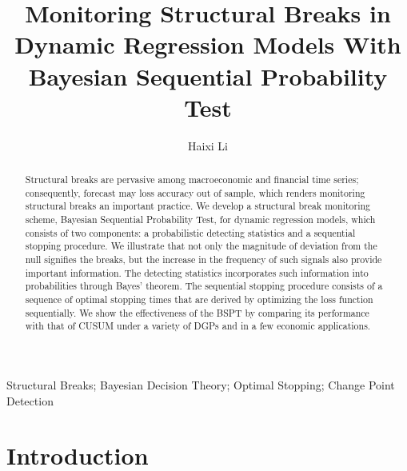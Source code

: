 \documentclass[preprint,authoryear,12pt,english]{elsarticle}
\theoremstyle{plain}
\begin{document}
\begin{frontmatter}
    \title{Monitoring Structural Breaks in Dynamic Regression Models With Bayesian Sequential Probability Test}

    \author{Haixi Li}



    \address[a]{Freddie Mac, 1551 Park Run Dr., McLean, VA, 22102, USA; Tel: (571)7812981; Email: haixi\_li@freddiemac.com}


    \begin{abstract}
        Structural breaks are pervasive among macroeconomic and financial time series; consequently, forecast may loss accuracy out of sample, which renders monitoring structural breaks an important practice. We develop a structural break monitoring scheme, Bayesian Sequential Probability Test, for dynamic regression models, which consists of two components: a probabilistic detecting statistics and a sequential stopping procedure. We illustrate that not only the magnitude of deviation from the null signifies the breaks, but the increase in the frequency of such signals also provide important information. The detecting statistics incorporates such information into probabilities through Bayes' theorem. The sequential stopping procedure consists of a sequence of optimal stopping times that are derived by optimizing the loss function sequentially. We show the effectiveness of the BSPT by comparing its performance with that of CUSUM under a variety of DGPs and in a few economic applications.
    \end{abstract}

    \begin{keyword}
        Structural Breaks; Bayesian Decision Theory; Optimal Stopping; Change Point Detection
    \end{keyword}

\end{frontmatter}

\newpage
\setcounter{footnote}{0}
\section{Introduction}
\end{document}
